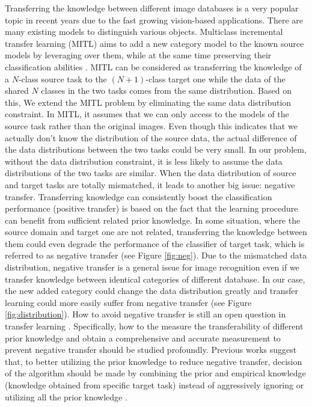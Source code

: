 Transferring the knowledge between different image databases is a very popular topic in recent years due to the fast growing vision-based applications. There are many existing models to distinguish various objects. Multiclass incremental transfer learning (MITL) aims to add a new category model to the known source models by leveraging over them, while at the same time preserving their classification abilities \cite{kuzborskij2013n}. MITL can be considered as transferring the knowledge of a $N$-class source task to the $(N+1)$-class target one while the data of the shared $N$ classes in the two tasks comes from the same distribution.
Based on this, We extend the MITL problem by eliminating the same data distribution constraint. 
In MITL, it assumes that we can only access to the models of the source task rather than the original images. Even though this indicates that we actually don't know the distribution of the source data, the actual difference of the data distributions between the two tasks could be very small. In our problem, without the data distribution constraint, it is less likely to assume the data distributions of the two tasks are similar. When the data distribution of source and target tasks are totally mismatched, it leads to another big issue: negative transfer. 
Transferring knowledge can consistently boost the classification performance (positive transfer) is based on the fact that the learning procedure can benefit from sufficient related prior knowledge. In some situation, where the source domain and target one are not related, transferring the knowledge between them could even degrade the performance of the classifier of target task, which is referred to as negative transfer (see Figure \ref{fig:neg}). 
Due to the mismatched data distribution, negative transfer is a general issue for image recognition even if we transfer knowledge between identical categories of different database. In our case, the new added category could change the data distribution greatly and transfer learning could more easily suffer from negative transfer (see Figure \ref{fig:distribution}). 
How to avoid negative transfer is still an open question in transfer learning \cite{Lu201514}. Specifically, how to the measure the transferability of different prior knowledge and obtain a comprehensive and accurate measurement to prevent negative transfer should be studied profoundly. Previous works suggest that, to better utilizing the prior knowledge to reduce negative transfer, decision of the algorithm should be made by combining the prior and empirical knowledge (knowledge obtained from specific target task) instead of aggressively ignoring or utilizing all the prior knowledge \cite{tommasi2014learning} \cite{kuzborskij2013n} \cite{yang2007cross} \cite{aytar2011tabula}.

